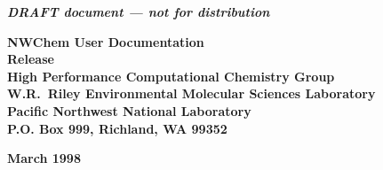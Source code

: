 
\begin{titlepage}

\begin{centering}

{\em\bf DRAFT document --- not for distribution\\[0.5in]}

{\bf\Huge NWChem User Documentation}\\[0.5in] 
{\bf\Huge Release \nwchemversion}\\[1.0in]

{\bf\Large High Performance Computational Chemistry Group\\
    W.R.\ Riley Environmental Molecular Sciences Laboratory\\
    Pacific Northwest National Laboratory\\
    P.O. Box 999, Richland, WA 99352\\[0.5in]}

{\bf\Large March 1998}\\[1.0in]




\end{centering}

\end{titlepage}

